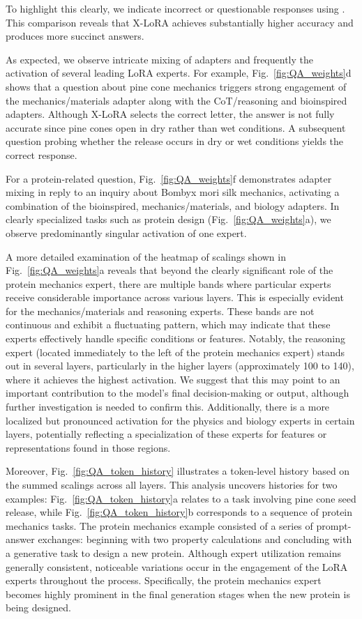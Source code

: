 To highlight this clearly, we indicate incorrect or questionable responses using . This comparison reveals that X-LoRA achieves substantially higher accuracy and produces more succinct answers.

As expected, we observe intricate mixing of adapters and frequently the activation of several leading LoRA experts. For example, Fig.~\ref{fig:QA_weights}d shows that a question about pine cone mechanics triggers strong engagement of the mechanics/materials adapter along with the CoT/reasoning and bioinspired adapters. Although X-LoRA selects the correct letter, the answer is not fully accurate since pine cones open in dry rather than wet conditions. A subsequent question probing whether the release occurs in dry or wet conditions yields the correct response.

For a protein-related question, Fig.~\ref{fig:QA_weights}f demonstrates adapter mixing in reply to an inquiry about Bombyx mori silk mechanics, activating a combination of the bioinspired, mechanics/materials, and biology adapters. In clearly specialized tasks such as protein design (Fig.~\ref{fig:QA_weights}a), we observe predominantly singular activation of one expert.

A more detailed examination of the heatmap of scalings shown in Fig.~\ref{fig:QA_weights}a reveals that beyond the clearly significant role of the protein mechanics expert, there are multiple bands where particular experts receive considerable importance across various layers. This is especially evident for the mechanics/materials and reasoning experts. These bands are not continuous and exhibit a fluctuating pattern, which may indicate that these experts effectively handle specific conditions or features. Notably, the reasoning expert (located immediately to the left of the protein mechanics expert) stands out in several layers, particularly in the higher layers (approximately 100 to 140), where it achieves the highest activation. We suggest that this may point to an important contribution to the model’s final decision-making or output, although further investigation is needed to confirm this. Additionally, there is a more localized but pronounced activation for the physics and biology experts in certain layers, potentially reflecting a specialization of these experts for features or representations found in those regions.

Moreover, Fig.~\ref{fig:QA_token_history} illustrates a token-level history based on the summed scalings across all layers. This analysis uncovers histories for two examples: Fig.~\ref{fig:QA_token_history}a relates to a task involving pine cone seed release, while Fig.~\ref{fig:QA_token_history}b corresponds to a sequence of protein mechanics tasks. The protein mechanics example consisted of a series of prompt-answer exchanges: beginning with two property calculations and concluding with a generative task to design a new protein. Although expert utilization remains generally consistent, noticeable variations occur in the engagement of the LoRA experts throughout the process. Specifically, the protein mechanics expert becomes highly prominent in the final generation stages when the new protein is being designed.

